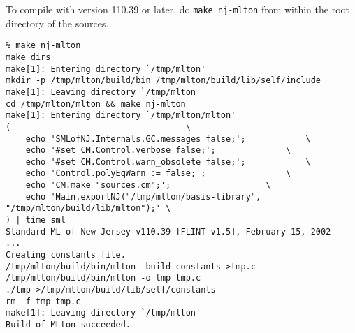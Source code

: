 To compile with {\smlnj} version 110.39 or later, do {\tt make nj-mlton} from
within the root directory of the sources.
\begin{verbatim}
% make nj-mlton
make dirs
make[1]: Entering directory `/tmp/mlton'
mkdir -p /tmp/mlton/build/bin /tmp/mlton/build/lib/self/include
make[1]: Leaving directory `/tmp/mlton'
cd /tmp/mlton/mlton && make nj-mlton
make[1]: Entering directory `/tmp/mlton/mlton'
(									\
	echo 'SMLofNJ.Internals.GC.messages false;';			\
	echo '#set CM.Control.verbose false;';				\
	echo '#set CM.Control.warn_obsolete false;';			\
	echo 'Control.polyEqWarn := false;';				\
	echo 'CM.make "sources.cm";';					\
	echo 'Main.exportNJ("/tmp/mlton/basis-library", "/tmp/mlton/build/lib/mlton");'	\
) | time sml
Standard ML of New Jersey v110.39 [FLINT v1.5], February 15, 2002
...
Creating constants file.
/tmp/mlton/build/bin/mlton -build-constants >tmp.c
/tmp/mlton/build/bin/mlton -o tmp tmp.c
./tmp >/tmp/mlton/build/lib/self/constants
rm -f tmp tmp.c
make[1]: Leaving directory `/tmp/mlton'
Build of MLton succeeded.
\end{verbatim}
